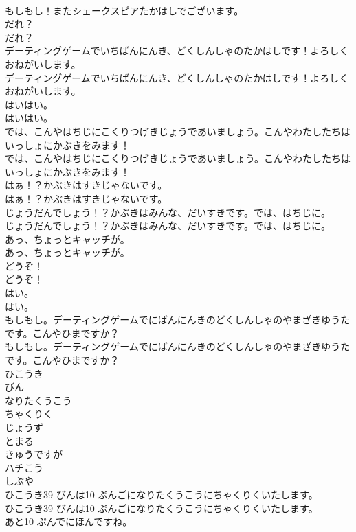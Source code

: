 \documentclass[8pt]{extreport}
\begin{document}
\begin{CJK}{UTF8}{min}
\\	もしもし！またシェークスピアたかはしでございます。 
\\	だれ？	
\\	だれ？ 
\\	デーティングゲームでいちばんにんき、どくしんしゃのたかはしです！よろしくおねがいします。	
\\	デーティングゲームでいちばんにんき、どくしんしゃのたかはしです！よろしくおねがいします。 
\\	はいはい。	
\\	はいはい。 
\\	では、こんやはちじにこくりつげきじょうであいましょう。こんやわたしたちはいっしょにかぶきをみます！	
\\	では、こんやはちじにこくりつげきじょうであいましょう。こんやわたしたちはいっしょにかぶきをみます！ 
\\	はぁ！？かぶきはすきじゃないです。	
\\	はぁ！？かぶきはすきじゃないです。 
\\	じょうだんでしょう！？かぶきはみんな、だいすきです。では、はちじに。	
\\	じょうだんでしょう！？かぶきはみんな、だいすきです。では、はちじに。 
\\	あっ、ちょっとキャッチが。	
\\	あっ、ちょっとキャッチが。 
\\	どうぞ！	
\\	どうぞ！ 
\\	はい。	
\\	はい。 
\\	もしもし。デーティングゲームでにばんにんきのどくしんしゃのやまざきゆうたです。こんやひまですか？	
\\	もしもし。デーティングゲームでにばんにんきのどくしんしゃのやまざきゆうたです。こんやひまですか？ 
\\	ひこうき
\\	びん
\\	なりたくうこう
\\	ちゃくりく
\\	じょうず
\\	とまる
\\	きゅうですが
\\	ハチこう
\\	しぶや
\\	ひこうき39 びんは10 ぷんごになりたくうこうにちゃくりくいたします。	
\\	ひこうき39 びんは10 ぷんごになりたくうこうにちゃくりくいたします。 
\\	あと10 ぷんでにほんですね。	

\end{CJK}
\end{document}
